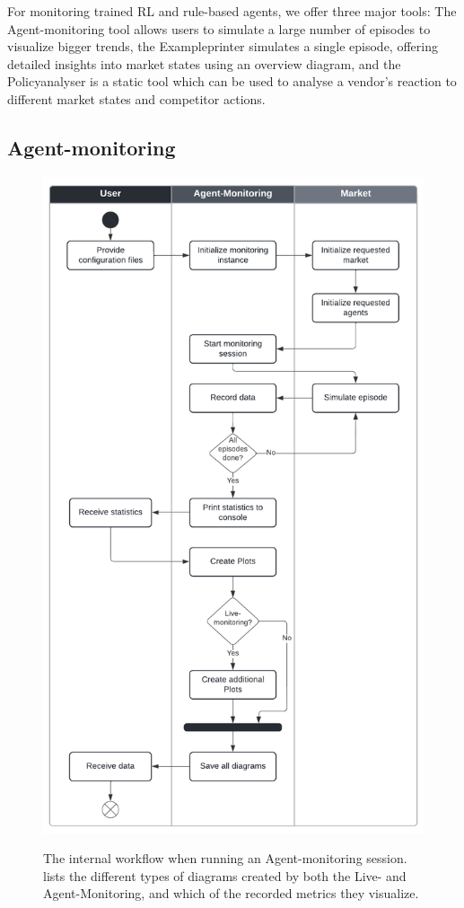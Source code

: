 For monitoring trained RL and rule-based agents, we offer three major tools: The Agent-monitoring tool allows users to simulate a large number of episodes to visualize bigger trends, the Exampleprinter simulates a single episode, offering detailed insights into market states using an overview diagram, and the Policyanalyser is a static tool which can be used to analyse a vendor's reaction to different market states and competitor actions.

\subsection{Agent-monitoring}\label{subsec:AgentMonitoring}

\begin{figure}
	\centering
	\includegraphics[height = 0.9\textheight]{images/swimlane_monitoring.pdf}\\
	\caption{The internal workflow when running an Agent-monitoring session.  lists the different types of diagrams created by both the Live- and Agent-Monitoring, and which of the recorded metrics they visualize.}\label{fig:SwimlaneMonitoring}
\end{figure}

